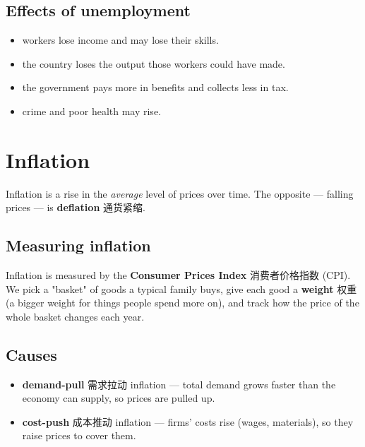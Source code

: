 \documentclass[11pt]{article}
\begin{document}
\subsection*{Effects of unemployment}

\begin{itemize}
\item workers lose income and may lose their skills.

\item the country loses the output those workers could have made.

\item the government pays more in benefits and collects less in tax.

\item crime and poor health may rise.

\end{itemize}

\section*{Inflation}

Inflation is a rise in the \emph{average} level of prices over time. The opposite — falling prices — is \textbf{deflation} 通货紧缩.

\subsection*{Measuring inflation}

Inflation is measured by the \textbf{Consumer Prices Index} 消费者价格指数 (CPI). We pick a "basket" of goods a typical family buys, give each good a \textbf{weight} 权重 (a bigger weight for things people spend more on), and track how the price of the whole basket changes each year.

\subsection*{Causes}

\begin{itemize}
\item \textbf{demand-pull} 需求拉动 inflation — total demand grows faster than the economy can supply, so prices are pulled up.

\item \textbf{cost-push} 成本推动 inflation — firms' costs rise (wages, materials), so they raise prices to cover them.

\end{itemize}
\end{document}
